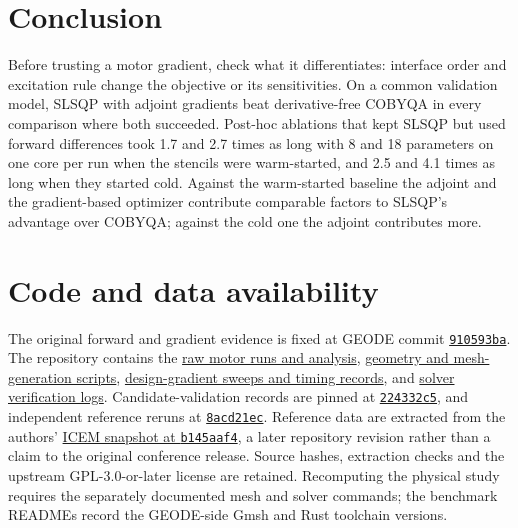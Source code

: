 \documentclass{anvil-paper}
\begin{document}
\section{Conclusion}
Before trusting a motor gradient, check what it differentiates: interface
order and excitation rule change the objective or its sensitivities. On a common validation model, SLSQP with adjoint
gradients beat derivative-free COBYQA in every comparison where both
succeeded. Post-hoc ablations that kept SLSQP but used forward
differences took 1.7 and 2.7 times as long with 8 and 18 parameters on one
core per run when the stencils were warm-started, and 2.5 and 4.1 times as
long when they started cold. Against the warm-started baseline the adjoint
and the gradient-based optimizer contribute comparable factors to SLSQP's
advantage over COBYQA; against the cold one the adjoint contributes more.

\section*{Code and data availability}
The original forward and gradient evidence is fixed at GEODE commit
\href{https://github.com/rjwalters/geode-fem/tree/910593bad6f64f9f01671c2632b57034e72b9c61}{\texttt{910593ba}}.
The repository contains the
\href{https://github.com/rjwalters/geode-fem/tree/910593bad6f64f9f01671c2632b57034e72b9c61/benchmarks/motor_reference/forward_harmonic}{raw motor runs and analysis},
\href{https://github.com/rjwalters/geode-fem/tree/910593bad6f64f9f01671c2632b57034e72b9c61/benchmarks/motor_reference/geometry}{geometry and mesh-generation scripts},
\href{https://github.com/rjwalters/geode-fem/tree/910593bad6f64f9f01671c2632b57034e72b9c61/benchmarks/motor_shape_gradient/design}{design-gradient sweeps and timing records},
and \href{https://github.com/rjwalters/geode-fem/tree/910593bad6f64f9f01671c2632b57034e72b9c61/benchmarks/motor_nonlinear_m1}{solver verification logs}.
Candidate-validation records are pinned at
\href{https://github.com/rjwalters/geode-fem/tree/224332c526be1191183af82b610973c7778de720/benchmarks/motor_validation}{\texttt{224332c5}},
and independent reference reruns at
\href{https://github.com/rjwalters/geode-fem/tree/8acd21ecf85d89fe077275a3c04ca70b53963d43/benchmarks/motor_reference/reference_refinement}{\texttt{8acd21ec}}.
Reference data are extracted from the authors'
\href{https://github.com/MichaelWiesheu/ICEMsnapshot/tree/b145aaf4ab1a6424828bc941eaf172f48fa0d458}{ICEM snapshot at \texttt{b145aaf4}},
a later repository revision rather than a claim to the original conference
release. Source hashes, extraction checks and the upstream GPL-3.0-or-later license
are retained. Recomputing the physical study requires the separately
documented mesh and solver commands; the benchmark READMEs record the
GEODE-side Gmsh and Rust toolchain versions.
\end{document}
